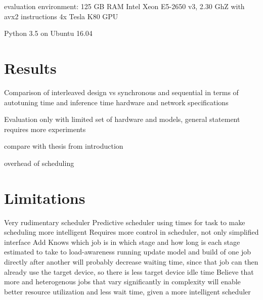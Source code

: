 evaluation environment:
125 GB RAM
Intel Xeon E5-2650 v3, 2.30 GhZ with avx2 instructions
4x Tesla K80 GPU

Python 3.5
on Ubuntu 16.04

\section{Results}
Comparison of interleaved design vs synchronous and sequential in terms of autotuning time and inference time
hardware and network specifications

Evaluation only with limited set of hardware and models, general statement requires more experiments

compare with thesis from introduction

overhead of scheduling

\section{Limitations}
Very rudimentary scheduler
Predictive scheduler using times for task to make scheduling more intelligent
Requires more control in scheduler, not only simplified interface
Add Knows which job is in which stage and how long is each stage estimated to take to load-awareness
running update model and build of one job directly after another will probably decrease waiting time, since that job can then already use the target device, so there is less target device idle time
Believe that more and heterogenous jobs that vary significantly in complexity will enable better resource utilization and less wait time, given a more intelligent scheduler